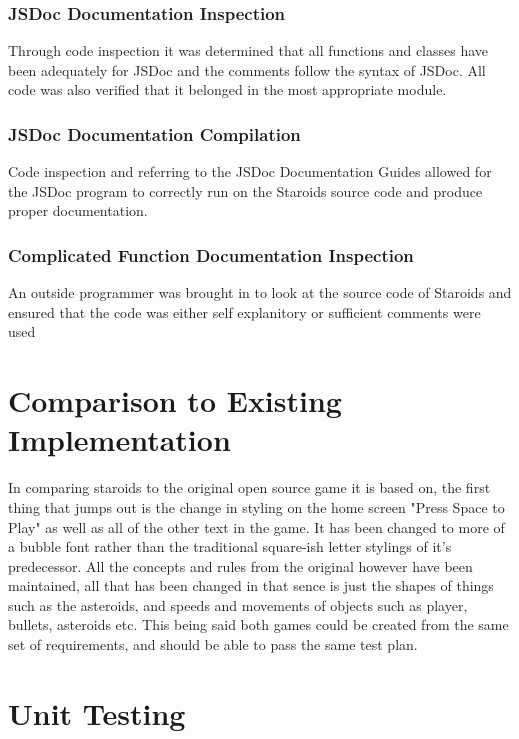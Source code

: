 \documentclass[12pt, titlepage]{article}
\begin{document}
\subsubsection{JSDoc Documentation Inspection}
Through code inspection it was determined that all functions and classes have been adequately for JSDoc and the comments follow the syntax of JSDoc. All code was also verified that it belonged in the most appropriate module.
\subsubsection{JSDoc Documentation Compilation}
Code inspection and referring to the JSDoc Documentation Guides allowed for the JSDoc program to correctly run on the Staroids source code and produce proper documentation.
\subsubsection{Complicated Function Documentation Inspection}
An outside programmer was brought in to look at the source code of Staroids and ensured that the code was either self explanitory or sufficient comments were used

\section{Comparison to Existing Implementation}

In comparing staroids to the original open source game it is based on, the first thing that jumps out is the change in styling on the home screen "Press Space to Play" as well as all of the other text in the game. It has been changed to more of a bubble font rather than the traditional square-ish letter stylings of it's predecessor. All the concepts and rules from the original however have been maintained, all that has been changed in that sence is just the shapes of things such as the asteroids, and speeds and movements of objects such as player, bullets, asteroids etc. This being said both games could be created from the same set of requirements, and should be able to pass the same test plan.

\section{Unit Testing}
\end{document}
